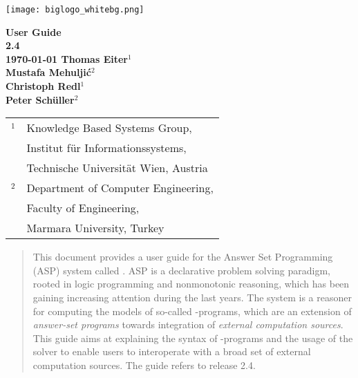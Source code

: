 \documentclass[a4paper, titlepage]{article}
\begin{document}
\begin{titlepage}
    \centering
    \vfill
    \texttt{[image: biglogo\_whitebg.png]}
    \vfill
    {\bfseries\Large
        {\Huge User Guide} \\
        {\Large \dlvhex{} 2.4} \\
        \vskip0.5cm
	    {\Large \today}        
        \vskip4cm
        Thomas Eiter$^1$\\[1cm]
        Mustafa Mehulji\'{c}$^2$ \\[1cm]
        Christoph Redl$^1$ \\[1cm]
        Peter Sch\"{u}ller$^2$ \\[1cm]
        \vspace{2cm}
        {
        \large\mdseries
        \begin{tabular}{r@{}l}
        {\Large$^1$}
          & Knowledge Based Systems Group,\\
          & Institut f\"ur Informationssystems,\\
          & Technische Universit\"at Wien, Austria \\[1ex]
        {\Large$^2$}
          & Department of Computer Engineering,\\
          & Faculty of Engineering, \\
          & Marmara University, Turkey \\
        \end{tabular}
        }
        \vspace{4cm}
    }    
    
\end{titlepage}
%
%
\begin{abstract}
This document provides a user guide for the Answer Set 
Programming (ASP) system called \dlvhex{}.
ASP is a declarative 
problem solving paradigm, rooted in logic programming and 
nonmonotonic reasoning, which has been gaining increasing 
attention during the last years. The \dlvhex{} system is a 
reasoner for computing the models of so-called \hex{}-programs, which are an extension of \emph{answer-set 
programs} towards integration of \emph{external computation 
sources}. This guide aims at explaining the syntax
of \hex{}-programs and the usage of the \dlvhex{} solver
to enable users 
to interoperate with a broad set of external computation 
sources. The guide refers to release 2.4.     
\end{abstract}
\end{document}
